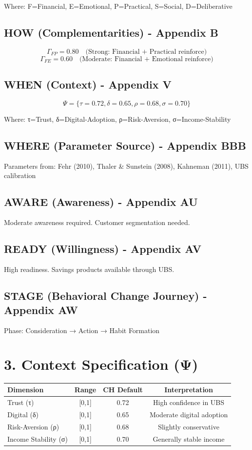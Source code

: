 \documentclass[11pt,a4paper]{article}
\begin{document}
Where: F=Financial, E=Emotional, P=Practical, S=Social, D=Deliberative

\subsection{HOW (Complementarities) - Appendix B}
\[
\Gamma_{FP} = 0.80 \quad \text{(Strong: Financial + Practical reinforce)}
\]
\[
\Gamma_{FE} = 0.60 \quad \text{(Moderate: Financial + Emotional reinforce)}
\]

\subsection{WHEN (Context) - Appendix V}
\[
\Psi = \{\tau=0.72, \delta=0.65, \rho=0.68, \sigma=0.70\}
\]

Where: τ=Trust, δ=Digital-Adoption, ρ=Risk-Aversion, σ=Income-Stability

\subsection{WHERE (Parameter Source) - Appendix BBB}
Parameters from: Fehr (2010), Thaler \& Sunstein (2008), Kahneman (2011), UBS calibration

\subsection{AWARE (Awareness) - Appendix AU}
Moderate awareness required. Customer segmentation needed.

\subsection{READY (Willingness) - Appendix AV}
High readiness. Savings products available through UBS.

\subsection{STAGE (Behavioral Change Journey) - Appendix AW}
Phase: Consideration → Action → Habit Formation

\section{3. Context Specification (Ψ)}

\begin{tabular}{lccc}
\toprule
Dimension & Range & CH Default & Interpretation \\
\midrule
Trust (τ) & [0,1] & 0.72 & High confidence in UBS \\
Digital (δ) & [0,1] & 0.65 & Moderate digital adoption \\
Risk-Aversion (ρ) & [0,1] & 0.68 & Slightly conservative \\
Income Stability (σ) & [0,1] & 0.70 & Generally stable income \\
\bottomrule
\end{tabular}
\end{document}
